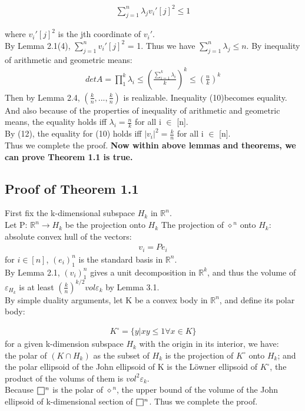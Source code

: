 \documentclass[fontsize=12pt,a4paper]{article}
\def\msquare{\mathord{\scalerel*{\Box}{gX}}}
\begin{document}
\begin{align}
    \sum_{j=1}^n \lambda_jv_i'[j]^2 \leq 1
\end{align}

where $v_i'[j]^2$ is the jth coordinate of $v_i'$.\\

By Lemma 2.1(4), $\sum_{j=1}^n v_i'[j]^2$ = 1. Thus we have $\sum_{j=1}^n \lambda_j \leq n$. 
By inequality of arithmetic and geometric means:\\
\begin{align}
    det A = \prod_{1}^k \lambda_i \leq (\frac{\sum_{i = 1}^k \lambda_i}{k})^k \leq (\frac{n}{k})^k
\end{align}
Then by Lemma 2.4, $(\frac{k}{n},...,\frac{k}{n})$ is realizable. Inequality (10)becomes equality. And also because of the properties of inequality of arithmetic and geometric means, the equality holds iff $\lambda_i = \frac{n}{k}$ for all i $\in$ [n].\\
By (12), the equality for (10) holds iff $|v_i|^2 = \frac{k}{n}$ for all i $\in$ [n].\\
Thus we complete the proof.
\vskip 1cm
\textbf{Now within above lemmas and theorems, we can prove Theorem 1.1 is true.}\\

\subsection{Proof of Theorem 1.1}
First fix the k-dimensional subspace $H_k$ in $\mathbb{R}^n$.\\
Let P: $\mathbb{R}^n \longrightarrow H_k$ be the projection onto $H_k$
The projection of $\diamond{}^n$ onto $H_k$: absolute convex hull of the vectors:
\begin{align}
    v_i = P e_i
\end{align}
for $i \in [n]$, $(e_i)^n_1$ is the standard basis in $\mathbb{R}^n$.\\
By Lemma 2.1, $(v_i)^n_1$ gives a unit decomposition in $\mathbb{R}^k$, and thus the volume of $\varepsilon_H_k$ is at least $(\frac{k}{n})^{k/2}vol\varepsilon_k$ by Lemma 3.1.\\
By simple duality arguments, let K be a convex body in $\mathbb{R}^n$, and define its polar body:

\begin{align}
   K^\circ = \{y|xy\leq 1 \forall x \in K\}
\end{align}
for a given k-dimension subspace $H_k$ with the origin in its interior, we have:\\
the polar of $(K\cap H_k)$ as the subset of $H_k$ is the projection of $K^\circ$ onto $H_k$; and the polar ellipsoid of the John ellipsoid of K is the Löwner ellipsoid of $K^\circ$, the product of the volums of them is $vol^2\varepsilon_k$.\\
Because $\msquare{}^n$ is the polar of $\diamond{}^n$, the upper bound of the volume of the John ellipsoid of k-dimensional section of $\msquare{}^n$.
Thus we complete the proof.
\end{document}
